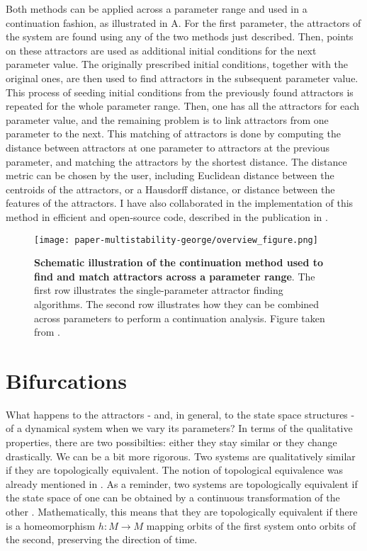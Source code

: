 Both methods can be applied across a parameter range and used in a continuation fashion, as illustrated in A. For the first parameter, the attractors of the system are found using any of the two methods just described. Then, points on these attractors are used as additional initial conditions for the next parameter value. The originally prescribed initial conditions, together with the original ones, are then used to find attractors in the subsequent parameter value. This process of seeding initial conditions from the previously found attractors is repeated for the whole parameter range. Then, one has all the attractors for each parameter value, and the remaining problem is to link attractors from one parameter to the next. This matching of attractors is done by computing the distance between attractors at one parameter to attractors at the previous parameter, and matching the attractors by the shortest distance. The distance metric can be chosen by the user, including Euclidean distance between the centroids of the attractors, or a Hausdorff distance, or distance between the features of the attractors. I have also collaborated in the implementation of this method in efficient and open-source code, described in the publication in . 
%
\begin{figure}
    \centering
    \texttt{[image: paper-multistability-george/overview\_figure.png]}
    \label{fig:method:continuation}
    \caption{\textbf{Schematic illustration of the continuation method used to find and match attractors across a parameter range}. The first row illustrates the single-parameter attractor finding algorithms. The second row illustrates how they can be combined across parameters to perform a continuation analysis. Figure taken from .}
\end{figure}


\section{Bifurcations}\label{method:bifurcations}
What happens to the attractors - and, in general, to the state space structures - of a dynamical system when we vary its parameters? In terms of the qualitative properties, there are two possibilties: either they stay similar or they change drastically. We can be a bit more rigorous. Two systems are qualitatively similar if they are topologically equivalent. The notion of topological equivalence was already mentioned in . As a reminder, two systems are topologically equivalent if the state space of one can be obtained by a continuous transformation of the other \cite{kuznetsov}. Mathematically, this means that they are topologically equivalent if there is a homeomorphism $h:M \to M$ mapping orbits of the first system onto orbits of the second, preserving the direction of time. 

